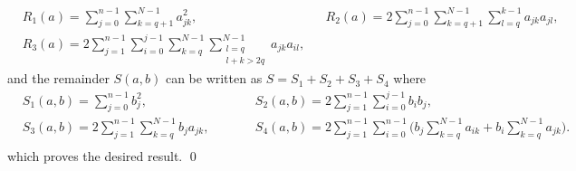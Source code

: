 \documentclass[10pt]{article}
\begin{document}
{	\begin{equation}
	\begin{alignedat}{2}
		&R_1(a) = \sum_{j=0}^{n-1}\sum_{k=q+1}^{N-1} a_{jk}^2,	&&R_2(a) = 2 \sum_{j=0}^{n-1}\sum_{k=q+1}^{N-1}\sum_{l=q}^{k-1} a_{jk} a_{jl},\\
		&R_3(a) = 2 \sum_{j=1}^{n-1} \sum_{i=0}^{j-1} \sum_{k=q}^{N-1}\sum_{\substack{l=q \\ l+k > 2q}}^{N-1} a_{jk}a_{il},
	\end{alignedat}
	\end{equation}
	and the remainder $S(a, b)$ can be written as $S = S_1 + S_2 + S_3 + S_4$ where
	\begin{equation}
	\begin{alignedat}{2}
		&S_1(a, b) = \sum_{j=0}^{n-1} b_j^2,  &&S_2(a, b) = 2\sum_{j=1}^{n-1} \sum_{i=0}^{j-1} b_i b_j, \\
		&S_3(a, b) = 2\sum_{j=1}^{n-1} \sum_{k=q}^{N-1} b_j a_{jk}, \qquad &&S_4(a, b) = 2\sum_{j=1}^{n-1}\sum_{i=0}^{n-1}\Big(b_j \sum_{k=q}^{N-1} a_{ik} + b_i \sum_{k=q}^{N-1} a_{jk}\Big).\\
	\end{alignedat}
	\end{equation}
	which proves the desired result. \qed 
}
\end{document}
